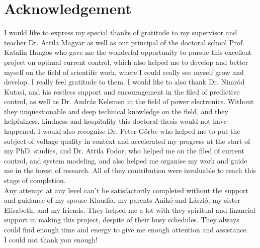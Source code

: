 \chapter*{Acknowledgement}
\thispagestyle{plain}
I would like to express my special thanks of gratitude to my supervisor and teacher Dr. Attila Magyar as well as our principal of the doctoral school Prof. Katalin Hangos who gave me the wonderful opportunity to pursue this excellent project on optimal current control, which also helped me to develop and better myself on the field of scientific work, where I could really see myself grow and develop. I really feel gratitude to them. I would like to also thank Dr. Nimród Kutasi, and his restless support and encouragement in the filed of predictive control, as well as Dr. András Kelemen in the field of power electronics. Without they unquestionable and deep technical knowledge on the field, and they helpfulness, kindness and hospitality this doctoral thesis would not have happened. I would also recognise Dr. Peter Görbe who helped me to put the subject of voltage quality in context and accelerated my progress at the start of my PhD. studies, and Dr. Attila Fodor, who helped me on the filed of current control, and system modeling, and also helped me organise my work and guide me in the forest of research. All of they contribution were invaluable to reach this stage of completion.\\
Any attempt at any level can't be satisfactorily completed without the support and guidance of my spouse Klaudia, my parents Anikó and László, my sister Elisabeth, and my friends. They helped me a lot with they spiritual and financial support in making this project, despite of their busy schedules. They always could find enough time and energy to give me enough attention and assistance.\\
I could not thank you enough!


